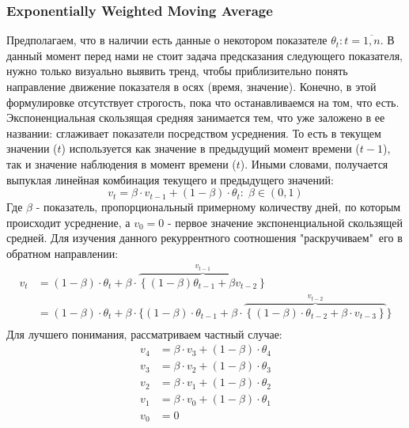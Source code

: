 \subsubsection{Exponentially Weighted Moving Average} \label{link::ewma}
Предполагаем, что в наличии есть данные о некотором показателе $\theta_t: t = \overline{1,n}$. В данный момент перед нами не стоит задача предсказания следующего показателя, нужно только визуально выявить тренд, чтобы приблизительно понять направление движение показателя в осях (время, значение). Конечно, в этой формулировке отсутствует строгость, пока что останавливаемся на том, что есть. Экспоненциальная скользящая средняя занимается тем, что уже заложено в ее названии: сглаживает показатели посредством усреднения. То есть в текущем значении ($t$) используется как значение в предыдущий момент времени ($t - 1$), так и значение наблюдения в момент времени ($t$). Иными словами, получается выпуклая линейная комбинация текущего и предыдущего значений:
\begin{equation}
	v_t = \beta \cdot v_{t - 1} + (1 - \beta) \cdot \theta_t: \; \beta \in (0,1)
\end{equation}
Где $\beta$ - показатель, пропорциональный примерному количеству дней, по которым происходит усреднение, а $v_0 = 0$ - первое значение экспоненциальной скользящей средней. Для изучения данного рекуррентного соотношения "раскручиваем"\ его в обратном направлении:
\begin{equation}
	\begin{split}
		v_t & =  (1 - \beta) \cdot \theta_t + \beta \cdot \overbrace{\left\{(1 - \beta) \theta_{t - 1} + \beta v_{t - 2}\right\}}^{v_{t - 1}}\\
		& =  (1 - \beta) \cdot \theta_t + \beta \cdot \{(1 - \beta) \cdot \theta_{t - 1} + \beta \cdot \overbrace{\left\{(1 - \beta) \cdot \theta_{t - 2} + \beta \cdot v_{t - 3}\right\}}^{v_{t - 2}}\}\\
	\end{split}
\end{equation}
Для лучшего понимания, рассматриваем частный случае:
\begin{equation}
	\begin{split}
		v_4 & = \beta \cdot v_3 + (1 - \beta) \cdot \theta_4\\
		v_3 & = \beta \cdot v_2 + (1 - \beta) \cdot \theta_3\\
		v_2 & = \beta \cdot v_1 + (1 - \beta) \cdot \theta_2\\
		v_1 & = \beta \cdot v_0 + (1 - \beta) \cdot \theta_1\\
		v_0 & = 0
	\end{split}
\end{equation}
